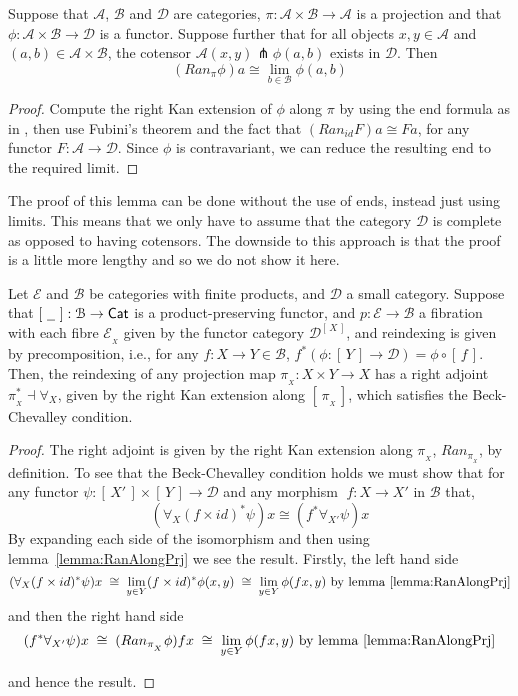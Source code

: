 \documentclass[a4paper,UKenglish]{lipics}
\newcommand{\msf}[1]{\mathsf{#1}} %
\newcommand{\Cat}{\msf{Cat}}
\newcommand{\A}{\mathcal{A}}
\newcommand{\B}{\mathcal{B}}
\newcommand{\D}{\mathcal{D}}
\newcommand{\E}{\mathcal{E}}
\newcommand{\fibreE}[1]{\E_{_{#1}}}
\newcommand{\blank}{\, \underline{\hspace{2mm}} \,}
\newcommand{\SqFun}[1][\blank]{[\, #1 \, ]} %
\begin{document}
\begin{lemma}
\label{lemma:RanAlongPrj}
 Suppose that $\A$, $\B$ and $\D$ are categories, $\pi: \A \times \B \rightarrow \A$ is a projection and that $\phi:\A \times \B \rightarrow \mathcal{D}$ is a functor. Suppose further that for all objects $x,y \in \A$ and $(a,b)\in \A \times \B$, the cotensor $\A(x, y) \pitchfork \phi (a,b)$ exists in $\mathcal{D}$. Then
 \[
  (Ran_{\pi}\phi)a \cong \lim_{b\in \B} \phi (a,b)
 \]
\end{lemma}

\begin{proof}
Compute the right Kan extension of $\phi$ along $\pi$ by using the end formula as in \cite{mac1998categories}, then use Fubini's theorem and the fact that $(Ran_{id} F)a \cong Fa$, for any functor $F: \A\rightarrow \mathcal{D}$. Since $\phi$ is contravariant, we can reduce the resulting end to the required limit.
\end{proof}
The proof of this lemma can be done without the use of ends, instead just using limits. This means that we only have to assume that the category $\mathcal{D}$ is complete as opposed to having cotensors. The downside to this approach is that the proof is a little more lengthy and so we do not show it here.

\begin{theorem}
\label{thm:BC}
Let $\E$ and $\B$ be categories with finite products, and $\mathcal{D}$ a small category. Suppose that $\SqFun : \B \rightarrow \Cat$ is a product-preserving functor, and $p:\E\rightarrow \B$ a fibration with each fibre $\fibreE{X}$ given by the functor category $\mathcal{D}^{\SqFun[X]}$, and reindexing is given by precomposition, i.e., for any $f:X\rightarrow Y \in \B$, $f^\ast (\phi : \SqFun[Y] \rightarrow \D) = \phi \circ \SqFun[f]$.
Then, the reindexing of any projection map $\pi_{_{X}} :X\times Y \rightarrow X $ has a right adjoint $\pi_{_{X}}^\ast \dashv \forall_X$, given by the right Kan extension along $\SqFun[\pi_{_{X}}]$, which satisfies the Beck-Chevalley condition.
\end{theorem}


\begin{proof}
The right adjoint is given by the right Kan extension along $\pi_{_{X}}$, $Ran_{\pi_{_{X}}} $, by definition. To see that the Beck-Chevalley condition holds we must show that for any functor $\psi: \SqFun[X'] \times \SqFun[Y] \rightarrow \D$ and any morphism $\; f:X\rightarrow X'$ in $\B$ that,
\[
(\forall_X(f\times id)^\ast \psi)x \cong (f^\ast \forall_{X'} \psi) x
\]
By expanding each side of the isomorphism and then using lemma~\ref{lemma:RanAlongPrj} we see the result. Firstly, the left hand side
\[
(\forall_X (f \times id)^\ast \psi)x  \; \cong \; \lim_{y \in Y} (f \times id)^{\ast} \phi (x,y) \; \cong \; \lim_{y\in Y} \phi(fx,y) \text{ by lemma~\ref{lemma:RanAlongPrj}}
\]
and then the right hand side
\[
(f^\ast \forall_{X'} \psi) x  \; \cong \;  (Ran_{\pi_{_{X}}} \phi ) fx \; \cong \;       \lim_{y\in Y} \phi (fx,y) \text{ by lemma~\ref{lemma:RanAlongPrj}}
\]

and hence the result.
\end{proof}
\end{document}
